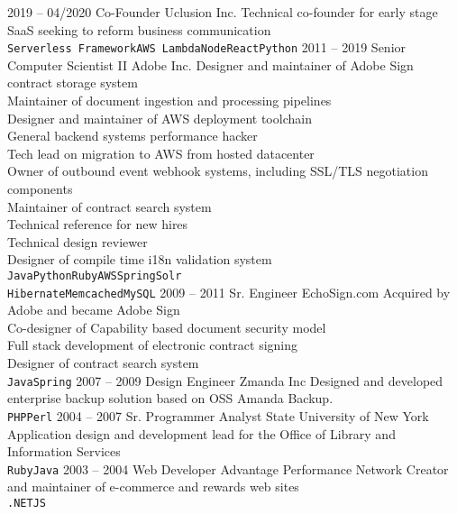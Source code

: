 \documentclass[9pt]{developercv} %
\begin{document}
\begin{entrylist}
	\entry
		{2019 -- 04/2020}
		{Co-Founder}
		{Uclusion Inc.}
	        {Technical co-founder for early stage SaaS seeking to reform business communication\\

		\texttt{Serverless Framework}\slashsep\texttt{AWS Lambda}\slashsep\texttt{Node}\slashsep\texttt{React}\slashsep\texttt{Python}}
	\entry
		{2011 -- 2019}
		{Senior Computer Scientist II}
		{Adobe Inc.}
                {Designer and maintainer of Adobe Sign contract storage system\\
                Maintainer of document ingestion and processing pipelines\\
                Designer and maintainer of AWS deployment toolchain\\
                General backend systems performance hacker\\
                Tech lead on migration to AWS from hosted datacenter\\
                Owner of outbound event webhook systems, including SSL/TLS negotiation components\\
                Maintainer of contract search system\\
                Technical reference for new hires\\
                Technical design reviewer\\
                Designer of compile time i18n validation system \\
		\texttt{Java}\slashsep\texttt{Python}\slashsep\texttt{Ruby}\slashsep\texttt{AWS}\slashsep\texttt{Spring}\slashsep\texttt{Solr}\\
                \texttt{Hibernate}\slashsep\texttt{Memcached}\slashsep\texttt{MySQL}
                }
	\entry
		{2009 -- 2011}
		{Sr. Engineer}
		{EchoSign.com}
                {Acquired by Adobe and became Adobe Sign\\
                  Co-designer of Capability based document security model\\
                  Full stack development of electronic contract signing \\
                  Designer of contract search system \\
		\texttt{Java}\slashsep\texttt{Spring}}
	\entry
		{2007 -- 2009}
		{Design Engineer}
		{Zmanda Inc}
                {Designed and developed enterprise backup solution based on OSS Amanda Backup.\\
		\texttt{PHP}\slashsep\texttt{Perl}}
	\entry
		{2004 -- 2007}
		{Sr. Programmer Analyst}
		{State University of New York}
                {Application design and development lead for the Office of Library and Information Services\\
		\texttt{Ruby}\slashsep\texttt{Java}}
	\entry
		{2003 -- 2004}
		{Web Developer}
		{Advantage Performance Network}
                {Creator and maintainer of e-commerce and rewards web sites\\
		\texttt{.NET}\slashsep\texttt{JS}}
\end{entrylist}
\end{document}

